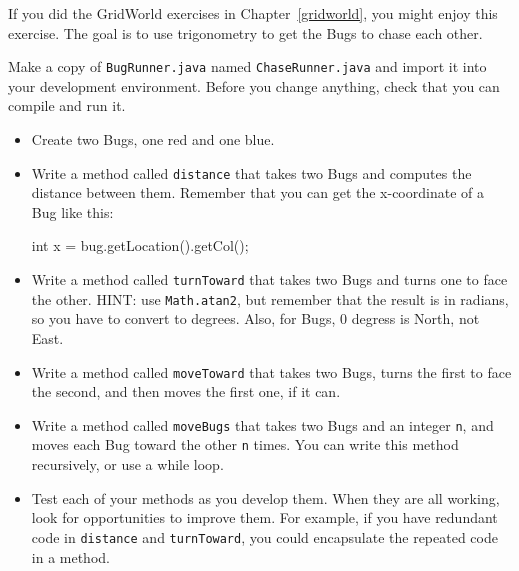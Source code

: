 \begin{exercise}

If you did the GridWorld exercises in Chapter~\ref{gridworld}, you
might enjoy this exercise.  The goal is to use trigonometry to get the
Bugs to chase each other.

Make a copy of {\tt BugRunner.java} named {\tt ChaseRunner.java} and
import it into your development environment.  Before you change
anything, check that you can compile and run it.

\begin{itemize}

\item Create two Bugs, one red and one blue.

\item Write a method called {\tt distance} that takes two Bugs
and computes the distance between them.  Remember that you can
get the x-coordinate of a Bug like this:

\begin{code}
    int x = bug.getLocation().getCol();
\end{code}

\item Write a method called {\tt turnToward} that takes two
Bugs and turns one to face the other.  HINT: use {\tt Math.atan2},
but remember that the result is in radians, so you have to
convert to degrees.  Also, for Bugs, 0 degress is North, not East.

\item Write a method called {\tt moveToward} that takes two
Bugs, turns the first to face the second, and then moves the
first one, if it can.

\item Write a method called {\tt moveBugs} that takes two Bugs
and an integer {\tt n}, and moves each Bug toward the other {\tt n}
times.  You can write this method recursively, or use a while loop.

\item Test each of your methods as you develop them.  When they are
  all working, look for opportunities to improve them.  For example,
  if you have redundant code in {\tt distance} and {\tt turnToward},
  you could encapsulate the repeated code in a method.

\end{itemize}

\end{exercise}
